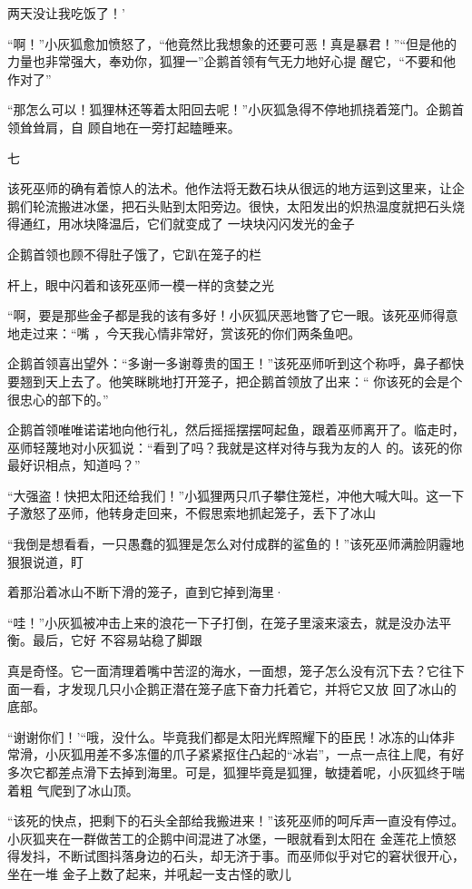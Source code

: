 \documentclass{article}
\begin{document}
两天没让我吃饭了！' 

“啊！”小灰狐愈加愤怒了，“他竟然比我想象的还要可恶！真是暴君！”“但是他的力量也非常强大，奉劝你，狐狸一”企鹅首领有气无力地好心提
醒它，“不要和他作对了” 

“那怎么可以！狐狸林还等着太阳回去呢！”小灰狐急得不停地抓挠着笼门。企鹅首领耸耸肩，自
顾自地在一旁打起瞌睡来。 


七 

该死巫师的确有着惊人的法术。他作法将无数石块从很远的地方运到这里来，让企鹅们轮流搬进冰堡，把石头贴到太阳旁边。很快，太阳发出的炽热温度就把石头烧得通红，用冰块降温后，它们就变成了
一块块闪闪发光的金子 

企鹅首领也顾不得肚子饿了，它趴在笼子的栏

\newpage
杆上，眼中闪着和该死巫师一模一样的贪婪之光 

“啊，要是那些金子都是我的该有多好！小灰狐厌恶地瞥了它一眼。该死巫师得意地走过来：“嘴
，今天我心情非常好，赏该死的你们两条鱼吧。 

企鹅首领喜出望外：“多谢一多谢尊贵的国王！”该死巫师听到这个称呼，鼻子都快要翘到天上去了。他笑眯眺地打开笼子，把企鹅首领放了出来：“
你该死的会是个很忠心的部下的。” 

企鹅首领唯唯诺诺地向他行礼，然后摇摇摆摆呵起鱼，跟着巫师离开了。临走时，巫师轻蔑地对小灰狐说：“看到了吗？我就是这样对待与我为友的人
的。该死的你最好识相点，知道吗？” 

“大强盗！快把太阳还给我们！”小狐狸两只爪子攀住笼栏，冲他大喊大叫。这一下子激怒了巫师，他转身走回来，不假思索地抓起笼子，丢下了冰山

“我倒是想看看，一只愚蠢的狐狸是怎么对付成群的鲨鱼的！”该死巫师满脸阴霾地狠狠说道，盯
\newpage

着那沿着冰山不断下滑的笼子，直到它掉到海里· 

“哇！”小灰狐被冲击上来的浪花一下子打倒，在笼子里滚来滚去，就是没办法平衡。最后，它好
不容易站稳了脚跟 

真是奇怪。它一面清理着嘴中苦涩的海水，一面想，笼子怎么没有沉下去？它往下面一看，才发现几只小企鹅正潜在笼子底下奋力托着它，并将它又放
回了冰山的底部。 

“谢谢你们！’“哦，没什么。毕竟我们都是太阳光辉照耀下的臣民！冰冻的山体非常滑，小灰狐用差不多冻僵的爪子紧紧抠住凸起的“冰岩”，一点一点往上爬，有好多次它都差点滑下去掉到海里。可是，狐狸毕竟是狐狸，敏捷着呢，小灰狐终于喘着粗
气爬到了冰山顶。 

“该死的快点，把剩下的石头全部给我搬进来！”该死巫师的呵斥声一直没有停过。小灰狐夹在一群做苦工的企鹅中间混进了冰堡，一眼就看到太阳在
\newpage
金莲花上愤怒得发抖，不断试图抖落身边的石头，却无济于事。而巫师似乎对它的窘状很开心，坐在一堆
金子上数了起来，并吼起一支古怪的歌儿 
\end{document}
